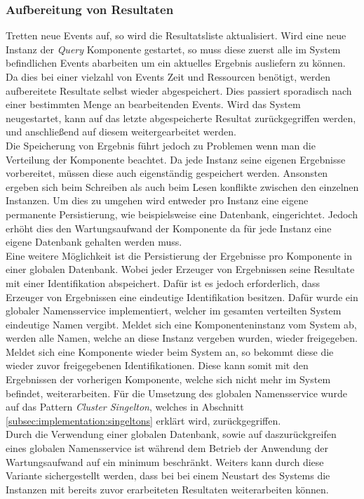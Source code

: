 \subsubsection{Aufbereitung von Resultaten}
\label{subsubsub:implementation:queryActorModel:resultPreparator}
Tretten neue Events auf, so wird die Resultatsliste aktualisiert. Wird eine neue Instanz der \textit{Query} Komponente gestartet, so muss diese zuerst alle im System befindlichen Events abarbeiten um ein aktuelles Ergebnis ausliefern zu können. Da dies bei einer vielzahl von Events Zeit und Ressourcen benötigt, werden aufbereitete Resultate selbst wieder abgespeichert. Dies passiert sporadisch nach einer bestimmten Menge an bearbeitenden Events. Wird das System neugestartet, kann auf das letzte abgespeicherte Resultat zurückgegriffen werden, und anschließend auf diesem weitergearbeitet werden. \\
Die Speicherung von Ergebnis führt jedoch zu Problemen wenn man die Verteilung der Komponente beachtet. Da jede Instanz seine eigenen Ergebnisse vorbereitet, müssen diese auch eigenständig gespeichert werden. Ansonsten ergeben sich beim Schreiben als auch beim Lesen konflikte zwischen den einzelnen Instanzen. Um dies zu umgehen wird entweder pro Instanz eine eigene permanente Persistierung, wie beispielsweise eine Datenbank, eingerichtet. Jedoch erhöht dies den Wartungsaufwand der Komponente da für jede Instanz eine eigene Datenbank gehalten werden muss. \\
Eine weitere Möglichkeit ist die Persistierung der Ergebnisse pro Komponente in einer globalen Datenbank. Wobei jeder Erzeuger von Ergebnissen seine Resultate mit einer Identifikation abspeichert. Dafür ist es jedoch erforderlich, dass Erzeuger von Ergebnissen eine eindeutige Identifikation besitzen. Dafür wurde ein globaler Namensservice implementiert, welcher im gesamten verteilten System eindeutige Namen vergibt. Meldet sich eine Komponenteninstanz vom System ab, werden alle Namen, welche an diese Instanz vergeben wurden, wieder freigegeben. Meldet sich eine Komponente wieder beim System an, so bekommt diese die wieder zuvor freigegebenen Identifikationen. Diese kann somit mit den Ergebnissen der vorherigen Komponente, welche sich nicht  mehr im System befindet, weiterarbeiten. Für die Umsetzung des globalen Namensservice wurde auf das Pattern \textit{Cluster Singelton}, welches in Abschnitt \ref{subsec:implementation:singeltons} erklärt wird, zurückgegriffen. \\
Durch die Verwendung einer globalen Datenbank, sowie auf daszurückgreifen eines globalen Namensservice ist während dem Betrieb der Anwendung der Wartungsaufwand auf ein minimum beschränkt. Weiters kann durch diese Variante sichergestellt werden, dass bei bei einem Neustart des Systems die Instanzen mit bereits zuvor erarbeiteten Resultaten weiterarbeiten können. 

